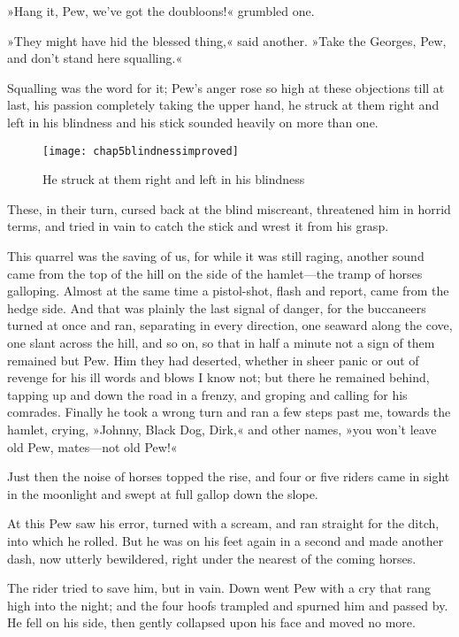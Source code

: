 »Hang it, Pew, we've got the doubloons!« grumbled one.

»They might have hid the blessed thing,« said another. »Take the Georges, Pew, and don't stand here squalling.«

Squalling was the word for it; Pew's anger rose so high at these objections till at last, his passion completely taking the upper hand, he struck at them right and left in his blindness and his stick sounded heavily on more than one.

\begin{sidewaysfigure}
\texttt{[image: chap5blindnessimproved]}%
\caption{He struck at them right and left in his blindness}
\end{sidewaysfigure} 

These, in their turn, cursed back at the blind miscreant, threat\-ened him in horrid terms, and tried in vain to catch the stick and wrest it from his grasp.

This quarrel was the saving of us, for while it was still raging, another sound came from the top of the hill on the side of the hamlet—the tramp of horses galloping. Almost at the same time a pistol-shot, flash and report, came from the hedge side. And that was plainly the last signal of danger, for the buccaneers turned at once and ran, separating in every direction, one seaward along the cove, one slant across the hill, and so on, so that in half a minute not a sign of them remained but Pew. Him they had deserted, whether in sheer panic or out of revenge for his ill words and blows I know not; but there he remained behind, tapping up and down the road in a frenzy, and groping and calling for his comrades. Finally he took a wrong turn and ran a few steps past me, towards the hamlet, crying, »Johnny, Black Dog, Dirk,« and other names, »you won't leave old Pew, mates—not old Pew!«

Just then the noise of horses topped the rise, and four or five riders came in sight in the moonlight and swept at full gallop down the slope.

At this Pew saw his error, turned with a scream, and ran straight for the ditch, into which he rolled. But he was on his feet again in a second and made another dash, now utterly bewildered, right under the nearest of the coming horses.

The rider tried to save him, but in vain. Down went Pew with a cry that rang high into the night; and the four hoofs trampled and spurned him and passed by. He fell on his side, then gently collapsed upon his face and moved no more.

